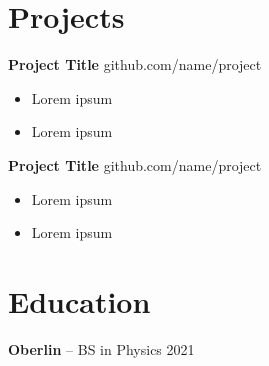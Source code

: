 \documentclass[11pt,letterpaper]{article}
\begin{document}
\vspace{-16.5pt}

\section*{Projects}
\textbf{Project Title} \hfill github.com/name/project \\
\vspace{-10pt}
\begin{itemize}
  \item Lorem ipsum
  \item Lorem ipsum
\end{itemize}

\textbf{Project Title} \hfill github.com/name/project \\
\vspace{-10pt}
\begin{itemize}
  \item Lorem ipsum
  \item Lorem ipsum
\end{itemize}


\vspace{-16.5pt}

\section*{Education}
\textbf{Oberlin} -- BS in Physics \hfill 2021
\end{document}

